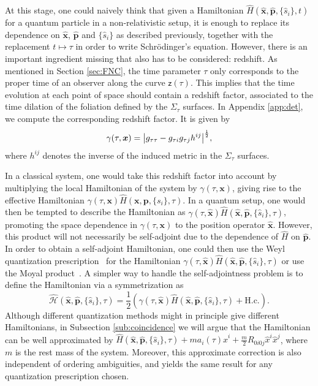 \documentclass[prd,twocolumn,superscriptaddress,floatfix,amsmath,amssymb,amsfonts,longbibliography,nofootinbib]{revtex4-1}
\newcommand{\mf}{\mathsf}%
\begin{document}
At this stage, one could naively think that given a Hamiltonian $\hat{H}(\hat{\bm x},\hat{\bm p},\{\hat{s}_i\},t)$ for a quantum particle in a non-relativistic setup, it is enough to replace its dependence on $\hat{\bm x}$, $\hat{\bm p}$ and $\{\hat{s}_i\}$ as described previously, together with the replacement $t\longmapsto\tau$ in order to write Schr\"odinger's equation. However, there is an important ingredient missing that also has to be considered: redshift. As mentioned in Section \ref{sec:FNC}, the time parameter $\tau$ only corresponds to the proper time of an observer along the curve $\mf z(\tau)$. This implies that the time evolution at each point of space should contain a redshift factor, associated to the time dilation of the foliation defined by the $\Sigma_\tau$ surfaces. In Appendix \ref{app:det}, we compute the corresponding redshift factor. It is given by
\begin{equation}\label{eq:redshift}
    \gamma(\tau,\bm x) = \abs{g_{\tau\tau} - g_{\tau i} g_{\tau j} h^{ij}}^{\frac{1}{2}},
\end{equation}
where $h^{ij}$ denotes the inverse of the induced metric in the $\Sigma_\tau$ surfaces. 

In a classical system, one would take this redshift factor into account by multiplying the local Hamiltonian of the system by $\gamma(\tau,{\bm x})$, giving rise to the effective Hamiltonian $\gamma(\tau,{\bm x})\hat{H}({\bm x},{\bm p},\{{s}_i\},\tau)$. In a quantum setup, one would then be tempted to describe the Hamiltonian as $\gamma(\tau,\hat{\bm x})\hat{H}(\hat{\bm x},\hat{\bm p},\{\hat{s}_i\},\tau)$, promoting the space dependence in $\gamma(\tau,\bm x)$ to the position operator $\hat{\bm x}$. However, this product will not necessarily be self-adjoint due to the dependence of $\hat{H}$ on $\hat{\bm p}$. In order to obtain a self-adjoint Hamiltonian, one could then use the Weyl quantization prescription~\cite{Weyl1927} for the Hamiltonian $\gamma(\tau,\hat{\bm x})\hat{H}(\hat{\bm x},\hat{\bm p},\{\hat{s}_i\},\tau)$ or use the Moyal product~\cite{moyal}. A simpler way to handle the self-adjointness problem is to define the Hamiltonian via a symmetrization as
\begin{equation}\label{eq:Hcurved}
    \hat{\mathcal{H}}(\hat{\bm x},\hat{\bm p},\{\hat{s}_i\},\tau) = \frac{1}{2}\left(\gamma(\tau,\hat{\bm x})\hat{H}(\hat{\bm x},\hat{\bm p},\{\hat{s}_i\},\tau) + \text{H.c.}\right).
\end{equation}
Although different quantization methods might in principle give different Hamiltonians, in Subsection \ref{sub:coincidence} we will argue that the Hamiltonian can be well approximated by \mbox{$\hat{H}(\hat{\bm x},\hat{\bm p},\{\hat{s}_i\},\tau)+ma_i(\tau)\hat{x}^i + \frac{m}{2}R_{0i0j}\hat{x}^i\hat{x}^j$}, where $m$ is the rest mass of the system. Moreover, this approximate correction is also independent of ordering ambiguities, and yields the same result for any quantization prescription chosen. %
\end{document}
